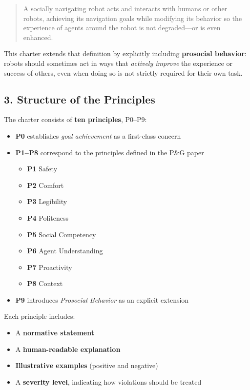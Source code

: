 \documentclass[utf8]{frontiers_suppmat} %
\providecommand{\tightlist}{%
  \setlength{\itemsep}{0pt}\setlength{\parskip}{0pt}}
\begin{document}
\begin{quote}
A socially navigating robot acts and interacts with humans or other
robots, achieving its navigation goals while modifying its behavior so
the experience of agents around the robot is not degraded---or is even
enhanced.
\end{quote}

This charter extends that definition by explicitly including
\textbf{prosocial behavior}: robots should sometimes act in ways that
\emph{actively improve} the experience or success of others, even when
doing so is not strictly required for their own task.

\subsection{3. Structure of the
Principles}\label{structure-of-the-principles}

The charter consists of \textbf{ten principles}, P0--P9:

\begin{itemize}
\tightlist
\item
  \textbf{P0} establishes \emph{goal achievement} as a first-class
  concern
\item
  \textbf{P1--P8} correspond to the principles defined in the P\&G paper

  \begin{itemize}
  \tightlist
  \item
    \textbf{P1} Safety
  \item
    \textbf{P2} Comfort
  \item
    \textbf{P3} Legibility
  \item
    \textbf{P4} Politeness
  \item
    \textbf{P5} Social Competency
  \item
    \textbf{P6} Agent Understanding
  \item
    \textbf{P7} Proactivity
  \item
    \textbf{P8} Context
  \end{itemize}
\item
  \textbf{P9} introduces \emph{Prosocial Behavior} as an explicit
  extension
\end{itemize}

Each principle includes:

\begin{itemize}
\tightlist
\item
  A \textbf{normative statement}
\item
  A \textbf{human-readable explanation}
\item
  \textbf{Illustrative examples} (positive and negative)
\item
  A \textbf{severity level}, indicating how violations should be treated
\end{itemize}
\end{document}
